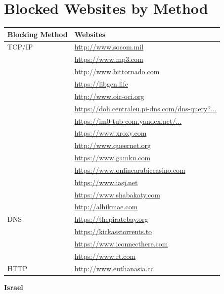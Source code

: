 \section*{Blocked Websites by Method}



\begin{tabular}{ll} 
\caption{Ireland}
\toprule
\textbf{Blocking Method} & \textbf{Websites} \\
\midrule
TCP/IP & \url{http://www.socom.mil} \\
       & \url{https://www.mp3.com} \\
       & \url{http://www.bittornado.com} \\
       & \url{https://libgen.life} \\
       & \url{http://www.oic-oci.org} \\
       & \url{https://doh.centraleu.pi-dns.com/dns-query?...} \\
       & \url{https://im0-tub-com.yandex.net/...} \\
       & \url{https://www.xroxy.com} \\
       & \url{http://www.queernet.org} \\
       & \url{https://www.gamku.com} \\
       & \url{https://www.onlinearabiccasino.com} \\
       & \url{https://www.iasj.net} \\
       & \url{https://www.shabakaty.com} \\
       & \url{http://alhikmae.com} \\
\midrule
DNS    & \url{https://thepiratebay.org} \\
       & \url{https://kickasstorrents.to} \\
       & \url{https://www.iconnecthere.com} \\
       & \url{https://www.rt.com} \\
\midrule
HTTP   & \url{http://www.euthanasia.cc} \\
\bottomrule
\end{tabular}

\vspace{1cm}

\textbf{Israel}

